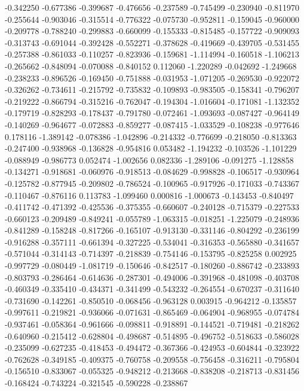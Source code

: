 -0.342250
-0.677386
-0.399687
-0.476656
-0.237589
-0.745499
-0.230940
-0.811970
-0.255644
-0.903046
-0.315514
-0.776322
-0.075730
-0.952811
-0.159045
-0.960000
-0.209778
-0.788240
-0.299883
-0.660099
-0.155333
-0.815485
-0.157722
-0.909093
-0.313743
-0.691044
-0.392428
-0.552271
-0.378628
-0.419669
-0.439705
-0.531455
-0.257388
-0.861033
-0.110257
-0.823936
-0.159681
-1.114994
-0.160518
-1.106213
-0.265662
-0.848094
-0.070088
-0.840152
0.112060
-1.220289
-0.042692
-1.249668
-0.238233
-0.896526
-0.169450
-0.751888
-0.031953
-1.071205
-0.269530
-0.922072
-0.326262
-0.734611
-0.215792
-0.735832
-0.109893
-0.983505
-0.158341
-0.796207
-0.219222
-0.866794
-0.315216
-0.762047
-0.194304
-1.016604
-0.171081
-1.132352
-0.179719
-0.828293
-0.178437
-0.791780
-0.072461
-1.093693
-0.087427
-0.964149
-0.140269
-0.964677
-0.072883
-0.859277
-0.087415
-1.033529
-0.108238
-0.977646
0.178116
-1.389142
-0.078386
-1.042896
-0.214332
-0.776699
-0.218050
-0.813363
-0.247400
-0.938968
-0.136828
-0.954816
0.053482
-1.194232
-0.103526
-1.101229
-0.088949
-0.986773
0.052474
-1.002656
0.082336
-1.289106
-0.091275
-1.128858
-0.134271
-0.918681
-0.060976
-0.918513
-0.084629
-0.998828
-0.106517
-0.930964
-0.125782
-0.877945
-0.209802
-0.786524
-0.100965
-0.917926
-0.171033
-0.743367
-0.110467
-0.876116
0.113783
-1.099460
0.000816
-1.000673
-0.143453
-0.840497
-0.411742
-0.471392
-0.425536
-0.375355
-0.660607
-0.240128
-0.715379
-0.227533
-0.660123
-0.209489
-0.849241
-0.055789
-1.063315
-0.018251
-1.225079
-0.248936
-0.841289
-0.158248
-0.817266
-0.165107
-0.913130
-0.331146
-0.804292
-0.236199
-0.916288
-0.357111
-0.661394
-0.327225
-0.534041
-0.316353
-0.565880
-0.341657
-0.571044
-0.314143
-0.714397
-0.218839
-0.754146
-0.153795
-0.825258
0.002925
-0.997729
-0.080449
-1.081719
-0.150646
-0.842517
-0.180260
-0.886742
-0.233893
-0.803793
-0.286464
-0.614636
-0.287301
-0.494006
-0.391968
-0.481098
-0.403708
-0.460349
-0.335410
-0.434371
-0.341499
-0.543232
-0.264554
-0.670237
-0.311640
-0.731690
-0.142261
-0.850510
-0.068456
-0.963128
0.003915
-0.964212
-0.135857
-0.997611
-0.219821
-0.936066
-0.071631
-0.865469
-0.064904
-0.968955
-0.074784
-0.937461
-0.058364
-0.961666
-0.098811
-0.918891
-0.144521
-0.719481
-0.218262
-0.640960
-0.215412
-0.628804
-0.498687
-0.514895
-0.496752
-0.518633
-0.586028
-0.235099
-0.627235
-0.418453
-0.494472
-0.367366
-0.424953
-0.604844
-0.323922
-0.762628
-0.349185
-0.409375
-0.760758
-0.209558
-0.756458
-0.316211
-0.795804
-0.156510
-0.833067
-0.055325
-0.948212
-0.213668
-0.838208
-0.218713
-0.831456
-0.168424
-0.743224
-0.321545
-0.590228
-0.238867
